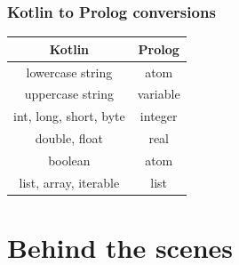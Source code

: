 \documentclass[presentation]{beamer}
\begin{document}
\begin{frame}%
    \frametitle{Kotlin to Prolog conversions}

    \begin{table}[]
        \centering
        \begin{tabular}{c|c}
            \textbf{Kotlin}        & \textbf{Prolog} \\
            \hline\hline
            lowercase string       & atom            \\
            uppercase string       & variable        \\
            int, long, short, byte & integer         \\
            double, float          & real            \\
            boolean                & atom            \\
            list, array, iterable  & list
        \end{tabular}
    \end{table}

\end{frame}

\section{Behind the scenes}
\end{document}
